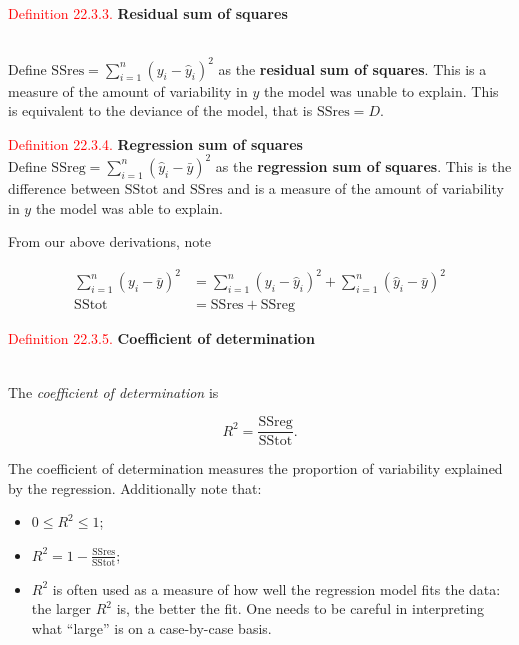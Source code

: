 \documentclass[
]{book}
\providecommand{\tightlist}{%
  \setlength{\itemsep}{0pt}\setlength{\parskip}{0pt}}
\begin{document}
\hfill\break

\leavevmode{}%
\textcolor{red}{Definition 22.3.3.}
{\textbf{Residual sum of squares}}\\
\strut \\
Define \(\text{SSres} = \sum\limits_{i=1}^n (y_i - \hat{y}_i)^2\) as the {\textbf{residual sum of squares}}. This is a measure of the amount of variability in \(y\) the model was unable to explain. This is equivalent to the deviance of the model, that is \(\text{SSres} = D\).

\hfill\break

\leavevmode{}%
\textcolor{red}{Definition 22.3.4.}
{\textbf{Regression sum of squares}}\\
\hspace*{0.333em}
Define \(\text{SSreg} = \sum\limits_{i=1}^n (\hat{y}_i - \bar{y})^2\) as the {\textbf{regression sum of squares}}. This is the difference between \(\text{SStot}\) and \(\text{SSres}\) and is a measure of the amount of variability in \(y\) the model was able to explain.

From our above derivations, note

\begin{align*}
\sum\limits_{i=1}^n (y_i - \bar{y})^2 &= \sum\limits_{i=1}^n (y_i - \hat{y}_i)^2 + \sum\limits_{i=1}^n (\hat{y}_i - \bar{y})^2 \\
\text{SStot} &= \text{SSres} + \text{SSreg}
\end{align*}

\hypertarget{Sec_Linear_ANOVA:def:CoD}{}
\textcolor{red}{Definition 22.3.5.}
{\textbf{Coefficient of determination}}\\
\strut \\
The \emph{coefficient of determination} is

\[R^2 = \frac{\text{SSreg}}{\text{SStot}}.\]

The coefficient of determination measures the proportion of variability explained by the regression. Additionally note that:

\begin{itemize}
\tightlist
\item
  \(0 \leq R^2 \leq 1\);\\
\item
  \(R^2 = 1 - \frac{\text{SSres}}{\text{SStot}}\);\\
\item
  \(R^2\) is often used as a measure of how well the regression model fits the data: the larger \(R^2\) is, the better the fit. One needs to be careful in interpreting what ``large'' is on a case-by-case basis.
\end{itemize}
\end{document}

